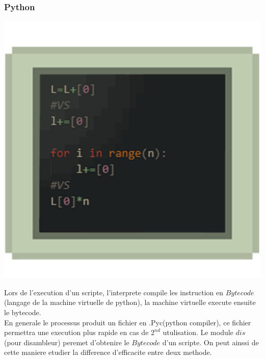 \documentclass[a4paper,11pt]{article}
\begin{document}
      \subsubsection{Python}
      \noindent\begin{minipage}{0.4\textwidth}%
    \includegraphics[width=\linewidth]{fig3.png}
    \end{minipage}%
  \hfill%
  \begin{minipage}{0.5\textwidth}\raggedleft
    Lors de l'execution d'un scripte, l'interprete compile les instruction en $Bytecode$(langage de la machine virtuelle de python), la machine virtuelle execute ensuite le bytecode.\\
        En generale le processus produit un fichier en .Pyc(python compiler), ce fichier permettra une execution plus rapide en cas de $2^{nd}$ utulisation.
        Le module $dis$(pour disambleur) peremet d'obtenire le $Bytecode$ d'un scripte. On peut ainssi de cette maniere etudier la difference d'efficacite entre deux methode.
  \end{minipage}
\end{document}
